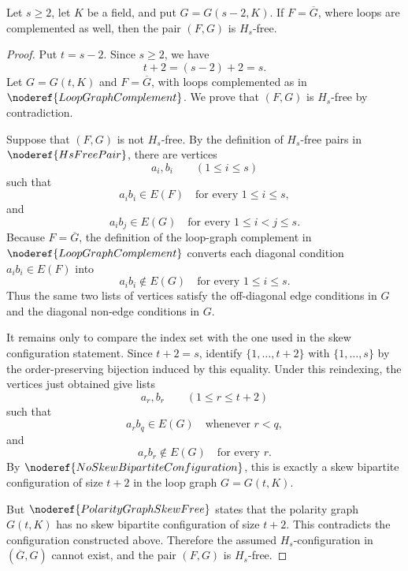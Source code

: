 \begin{lemma}
Let \(s\ge 2\), let \(K\) be a field, and put \(G=G(s-2,K)\). If \(F=\overline G\), where loops are complemented as well, then the pair \((F,G)\) is \(H_s\)-free.
\end{lemma}
\begin{proof}
Put \(t=s-2\). Since \(s\ge 2\), we have
\[
  t+2=(s-2)+2=s.
\]
Let \(G=G(t,K)\) and \(F=\overline G\), with loops complemented as in
\(\noderef{LoopGraphComplement}\). We prove that \((F,G)\) is \(H_s\)-free by
contradiction.

Suppose that \((F,G)\) is not \(H_s\)-free. By the definition of
\(H_s\)-free pairs in \(\noderef{HsFreePair}\), there are vertices
\[
  a_i,b_i \qquad (1\le i\le s)
\]
such that
\[
  a_i b_i\in E(F) \quad\text{for every } 1\le i\le s,
\]
and
\[
  a_i b_j\in E(G) \quad\text{for every } 1\le i<j\le s.
\]
Because \(F=\overline G\), the definition of the loop-graph complement in
\(\noderef{LoopGraphComplement}\) converts each diagonal condition
\(a_i b_i\in E(F)\) into
\[
  a_i b_i\notin E(G) \quad\text{for every } 1\le i\le s.
\]
Thus the same two lists of vertices satisfy the off-diagonal edge conditions
in \(G\) and the diagonal non-edge conditions in \(G\).

It remains only to compare the index set with the one used in the skew
configuration statement. Since \(t+2=s\), identify \(\{1,\ldots,t+2\}\) with
\(\{1,\ldots,s\}\) by the order-preserving bijection induced by this equality.
Under this reindexing, the vertices just obtained give lists
\[
  a_r,b_r \qquad (1\le r\le t+2)
\]
such that
\[
  a_r b_q\in E(G) \quad\text{whenever } r<q,
\]
and
\[
  a_r b_r\notin E(G) \quad\text{for every } r.
\]
By \(\noderef{NoSkewBipartiteConfiguration}\), this is exactly a skew
bipartite configuration of size \(t+2\) in the loop graph \(G=G(t,K)\).

But \(\noderef{PolarityGraphSkewFree}\) states that the polarity graph
\(G(t,K)\) has no skew bipartite configuration of size \(t+2\). This
contradicts the configuration constructed above. Therefore the assumed
\(H_s\)-configuration in \((\overline G,G)\) cannot exist, and the pair
\((F,G)\) is \(H_s\)-free.
\end{proof}
